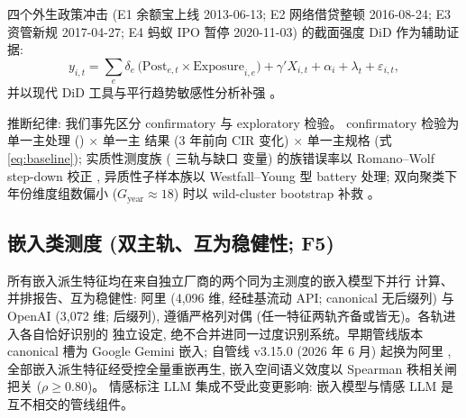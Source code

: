 四个外生政策冲击 (E1 余额宝上线 2013-06-13; E2 网络借贷整顿
2016-08-24; E3 资管新规 2017-04-27; E4 蚂蚁 IPO 暂停 2020-11-03)
的截面强度 DiD 作为辅助证据:
\begin{equation}
y_{i,t} = \sum_{e}\delta_e\,
 \bigl(\mathrm{Post}_{e,t}\times \mathrm{Exposure}_{i,e}\bigr)
 + \gamma' X_{i,t} + \alpha_i + \lambda_t + \varepsilon_{i,t},
\label{eq:did}
\end{equation}
并以现代 DiD 工具与平行趋势敏感性分析补强
\parencite{callaway2021difference,rambachan2023more}。

推断纪律: 我们事先区分 confirmatory 与 exploratory 检验。
confirmatory 检验为单一主处理 () $\times$ 单一主
结果 (3 年前向 CIR 变化) $\times$ 单一主规格 (式
\eqref{eq:baseline}); 实质性测度族 ( 三轨与缺口
变量) 的族错误率以 Romano--Wolf step-down 校正
\parencite{romanowolf2005stepwise}, 异质性子样本族以
Westfall--Young 型 battery 处理; 双向聚类下年份维度组数偏小
($G_{\text{year}}\approx18$) 时以 wild-cluster bootstrap 补救
\parencite{roodman2019boottest}。

\subsection{嵌入类测度 (双主轨、互为稳健性; F5)}
所有嵌入派生特征均在来自独立厂商的两个同为主测度的嵌入模型下并行
计算、并排报告、互为稳健性: 阿里 
(4{,}096 维, 经硅基流动 API; canonical 无后缀列) 与 OpenAI
 (3{,}072 维;  后缀列),
遵循严格列对偶 (任一特征两轨齐备或皆无)。各轨进入各自恰好识别的
独立设定, 绝不合并进同一过度识别系统。早期管线版本 canonical 槽为
Google Gemini 嵌入; 自管线 v3.15.0 (2026 年 6 月) 起换为阿里
, 全部嵌入派生特征经受控全量重嵌再生,
嵌入空间语义效度以 Spearman 秩相关闸把关 ($\rho \geq 0.80$)。
情感标注 LLM 集成不受此变更影响: 嵌入模型与情感 LLM
是互不相交的管线组件。

